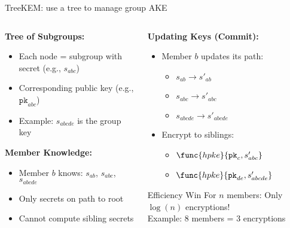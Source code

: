 \documentclass[aspectratio=169, lualatex, handout]{beamer}
\begin{document}
\begin{frame}{TreeKEM: use a tree to manage group AKE}
	\begin{columns}[c]
		\begin{column}{0.5\textwidth}
			\textbf{Tree of Subgroups:}
			\begin{itemize}
				\item Each node = subgroup with secret (e.g., $s_{abc}$)
				\item Corresponding public key (e.g., $\texttt{pk}_{abc}$)
				\item Example: $s_{abcde}$ is the group key
			\end{itemize}
			\textbf{Member Knowledge:}
			\begin{itemize}
				\item Member $b$ knows: $s_{ab}$, $s_{abc}$, $s_{abcde}$
				\item Only secrets on path to root
				\item Cannot compute sibling secrets
			\end{itemize}
		\end{column}
		\begin{column}{0.5\textwidth}
			\textbf{Updating Keys (Commit):}
			\begin{itemize}
				\item Member $b$ updates its path:
				      \begin{itemize}
					      \item $s_{ab} \rightarrow s'_{ab}$
					      \item $s_{abc} \rightarrow s'_{abc}$
					      \item $s_{abcde} \rightarrow s'_{abcde}$
				      \end{itemize}
				\item Encrypt to siblings:
				      \begin{itemize}
					      \item $\func{hpke}{\texttt{pk}_c, s'_{abc}}$
					      \item $\func{hpke}{\texttt{pk}_{de}, s'_{abcde}}$
				      \end{itemize}
			\end{itemize}
			\begin{alertblock}{Efficiency Win}
				For $n$ members: Only $\log(n)$ encryptions!\\
				Example: 8 members = 3 encryptions
			\end{alertblock}
		\end{column}
	\end{columns}
\end{frame}
\end{document}
